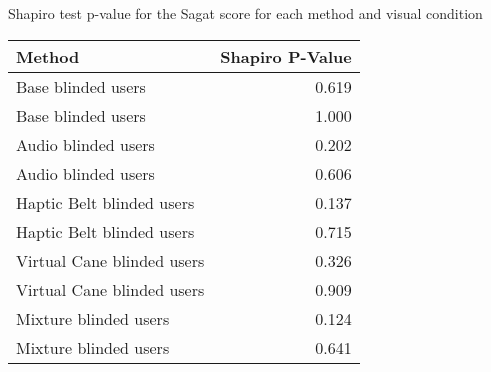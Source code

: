 
\centering
\caption{Shapiro test p-value for the Sagat score for each method and visual condition}
\label{tab:shapiro_sagat_score}
\begin{tabular}{lr}
\toprule
                    Method &  Shapiro P-Value \\
\midrule
        Base blinded users &            0.619 \\
        Base blinded users &            1.000 \\
       Audio blinded users &            0.202 \\
       Audio blinded users &            0.606 \\
 Haptic Belt blinded users &            0.137 \\
 Haptic Belt blinded users &            0.715 \\
Virtual Cane blinded users &            0.326 \\
Virtual Cane blinded users &            0.909 \\
     Mixture blinded users &            0.124 \\
     Mixture blinded users &            0.641 \\
\bottomrule
\end{tabular}
